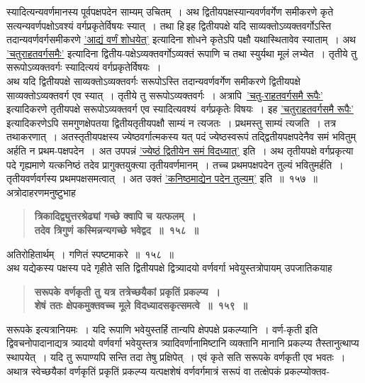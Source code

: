 \documentclass[11pt, openany]{book}
\begin{document}
\newpage

\begin{sloppypar}
\noindent स्यादित्यन्यवर्णमानस्य पूर्वपक्षपदेन साम्यम् उचितम्~। अथ द्वितीयपक्षस्यान्यवर्णवर्गेण समीकरणे कृते सत्यन्यवर्णपक्षोऽवश्यं वर्गप्रकृतेर्विषयः स्यात्~। तथा हि\textendash \,इह द्वितीयपक्षे यदि साव्यक्तोऽव्यक्तवर्गोऽस्ति तदान्यवर्णवर्गसमीकरणे \hyperref[9.134]{'आद्यं वर्णं शोधयेत्'} इत्यादिना शोधने कृतेऽपि पक्षौ यथास्थितावेव स्याताम्~। अथ \hyperref[8.116]{'चतुराहतवर्गसमैः'} इत्यादिना द्वितीय-पक्षेऽव्यक्तवर्गोऽव्यक्तं रूपाणि च तथा स्युर्यथा मूलं लभ्येत~। तृतीये तु सरूपोऽव्यक्तवर्गः स्यादित्ययं वर्गप्रकृतेर्विषयः~।\\

अथ यदि द्वितीयपक्षे साव्यक्तोऽव्यक्तवर्गः सरूपोऽस्ति तदान्यवर्णवर्गेण समीकरणे द्वितीयपक्षे साव्यक्तोऽव्यक्तवर्ग एव स्यात्~। तृतीये तु सरूपोऽव्यक्तवर्गः~। अत्रापि~\hyperref[8.116]{'चतु-राहतवर्गसमै रूपैः'} इत्यादिकरणे तृतीयपक्षे सरूपोऽव्यक्तवर्ग एव स्यादित्यवश्यं~वर्गप्रकृतेः विषयः~। इह \hyperref[8.116]{'चतुराहतवर्गसमै रूपैः'} इत्यादिकरणेऽपि समगुणक्षेपतया द्वितीयतृतीयपक्षौ साम्यं न त्यजतः~। प्रथमस्तु साम्यं त्यजति~। तत्र तथाकरणात्~। अतस्तृतीयपक्षस्य ज्येष्ठवर्गात्मकस्य यत् पदं ज्येष्ठस्वरूपं तद्द्वितीयपक्षपदेनैव समं भवितुम् अर्हति न प्रथम-पक्षपदेन~। अत उपपन्नं \hyperref[10.157]{'ज्येष्ठं द्वितीयेन समं विदध्यात्'} इति~। अथ तृतीयपक्षे वर्गप्रकृत्या पदे गृह्यमाणे यत्कनिष्ठं तदेव प्रागुक्तयुक्त्या तृतीयवर्णमानम्~। तच्च प्रथमपक्षपदेन तुल्यं भवितुमर्हति~। तृतीयवर्णवर्गस्य प्रथमपक्षसमत्वात्~। अत उक्तं \hyperref[10.157]{'कनिष्ठमाद्येन पदेन तुल्यम्'} इति~॥~१५७~॥\\

{\small अत्रोदाहरणमनुष्टुभाह\textendash }

 \label{10.158}
\begin{quote}
{\large \textbf{{\color{purple}त्रिकादिद्व्युत्तरश्रेढ्यां गच्छे क्वापि च यत्फलम्~।\\
तदेव त्रिगुणं कस्मिन्नन्यगच्छे भवेद्वद~॥~१५८~॥}}}
\end{quote}

अतिरोहितार्थम्~। गणितं स्पष्टमाकरे~॥~१५८~॥\\

{\small अथ यद्येकस्य पक्षस्य पदे गृहीते सति द्वितीयपक्षे द्वित्र्यादयो वर्णवर्गा भवेयुस्तत्रोपायम् उपजातिकयाह\textendash }

 \label{10.159}
\begin{quote}
{\large \textbf{{\color{purple}सरूपके वर्णकृती तु यत्र तत्रेच्छयैकां प्रकृतिं प्रकल्प्य~।\\
शेषं ततः क्षेपकमुक्तवच्च मूले विदध्यादसकृत्समत्वे~॥~१५९~॥}}}
\end{quote}

सरूपके इत्यत्रानियमः~। यदि रूपाणि भवेयुस्तर्हि तान्यपि क्षेपपक्षे प्रकल्प्यानि~। वर्ण-कृती इति द्विवचनोपादानाद्यत्र त्र्यादयो वर्णवर्गा भवेयुस्तत्र त्र्यादिवर्णानामिष्टानि व्यक्तानि मानानि प्रकल्प्य तैस्तानुत्थाप्य स्थापयेत्~। यदि तु रूपाण्यपि सन्ति तदा तेषु प्रक्षिपेत्~। एवं कृते सति सरूपके वर्णकृती एव भवतः~। अथात्र स्वेच्छयैकां वर्णकृतिं प्रकृतिं प्रकल्प्य यत्पक्षशेषं वर्णवर्गमात्रं सरूपं वा तत्क्षेपकं प्रकल्प्योक्तव-
\end{sloppypar}
\end{document}
